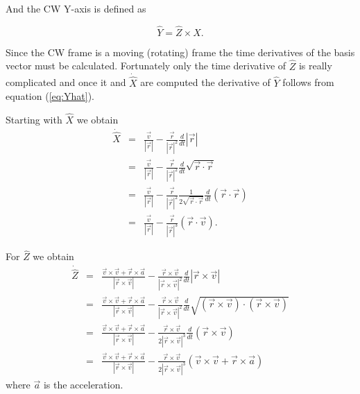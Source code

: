 \documentclass[twocolumn]{article}
\begin{document}
And the CW Y-axis is defined as

\begin{equation}\label{eq:Yhat}
 	\hat Y = \hat Z \times \hat X.
\end{equation}

Since the CW frame is a moving (rotating) frame the time derivatives of the 
basis vector must be calculated.  Fortunately only the time derivative of 
$\hat Z$ is really complicated and once it and ${\dot {\hat X}}$ are computed 
the derivative of $\hat Y$ follows from equation (\ref{eq:Yhat}).  

Starting with $\hat X$ we obtain
\begin{eqnarray}\label{eq:Xhatdot}
	\dot{	\hat X} & = &  \frac{\vec v}{| \vec r |} - \frac{\vec r}{| \vec r |^2} 
	                     \frac{d}{dt} | \vec r | \nonumber \\
 	    	        & = &  \frac{\vec v}{| \vec r |} - \frac{\vec r}{| \vec r |^2}
 	    	               \frac{d}{dt} \sqrt{ \vec r \cdot \vec r} \nonumber \\
			        & = &  \frac{\vec v}{| \vec r |} - \frac{\vec r}{| \vec r |^2} 
			               \frac{1}{2 \sqrt{ \vec r \cdot \vec r} } \frac{d}{dt} 
			               \left( { \vec r \cdot \vec r} \right) \nonumber \\
			        & = &  \frac{\vec v}{| \vec r |} - \frac{\vec r}{| \vec r |^3} 
			               \left( { \vec r \cdot \vec v} \right).
\end{eqnarray}

For $\hat Z$ we obtain
\begin{eqnarray}\label{eq:Zhatdot}
	\dot{	\hat Z} & = & \frac{ \vec v \times \vec v + \vec r \times \vec a} 
	                         { |  \vec r \times \vec v  |} - 
	                    \frac{ \vec r \times \vec v} 
	                         { |  \vec r \times \vec v  |^2 } 
	                    \frac{d}{dt} |  \vec r \times \vec v  |  \nonumber \\
	              & = & \frac{ \vec v \times \vec v + \vec r \times \vec a} 
	                         { |  \vec r \times \vec v  |} - 
	                    \frac{ \vec r \times \vec v} 
	                         { |  \vec r \times \vec v  |^2 } 
	                    \frac{d}{dt} 
	                    \sqrt{\left( \vec r \times \vec v \right) \cdot 
	                    \left( \vec r \times \vec v \right) } \nonumber \\
	              & = & \frac{ \vec v \times \vec v + \vec r \times \vec a} 
	                         { |  \vec r \times \vec v  |} - 
	                    \frac{ \vec r \times \vec v} 
	                         { 2 |  \vec r \times \vec v  |^3 } 
	                    \frac{d}{dt} 
	                    \left( \vec r \times \vec v \right) \nonumber \\
	              & = & \frac{ \vec v \times \vec v + \vec r \times \vec a} 
	                         { |  \vec r \times \vec v  |} - 
	                    \frac{ \vec r \times \vec v} 
	                         { 2 |  \vec r \times \vec v  |^3 } 
	                    \left( \vec v \times \vec v + \vec r \times \vec a \right)
\end{eqnarray}
where $\vec a$ is the acceleration.
 
\end{document}
